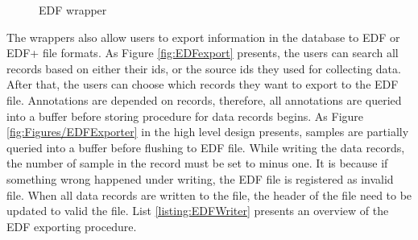 \begin{figure}[ht]
        \centering     %
        \caption{EDF wrapper}
\end{figure}
The wrappers also allow users to export information in the database to EDF or EDF+ file formats. As Figure \ref{fig:EDFexport} presents, the users can search all records based on either their ids, or the source ids they used for collecting data. After that, the users can choose which records they want to export to the EDF file. Annotations are depended on records, therefore, all annotations are queried into a buffer before storing procedure for data records begins. As Figure \ref{fig:Figures/EDFExporter} in the high level design presents, samples are partially queried into a buffer before flushing to EDF file. While writing the data records, the number of sample in the record must be set to minus one. It is because if something wrong happened under writing, the EDF file is registered as invalid file. When all data records are written to the file, the header of the file need to be updated to valid the file. List \ref{listing:EDFWriter} presents an overview of the EDF exporting procedure.
